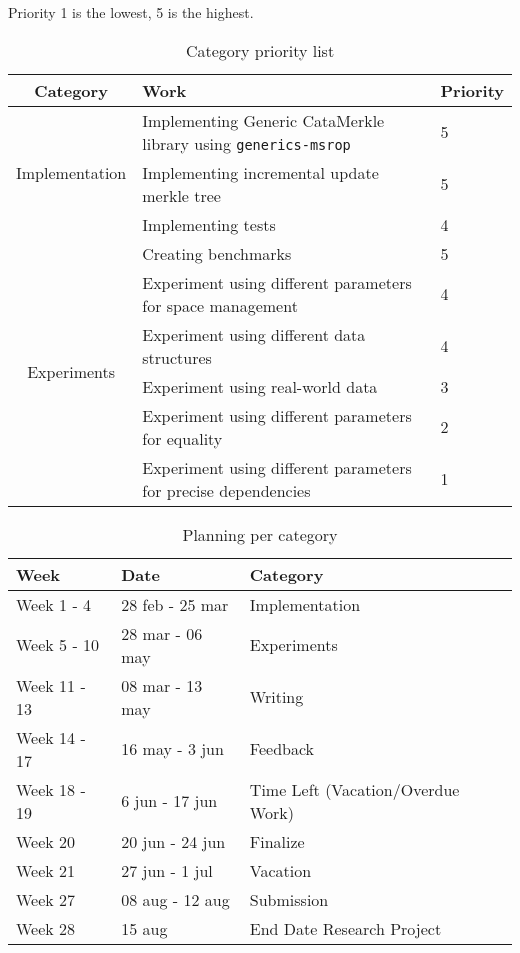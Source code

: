 Priority 1 is the lowest, 5 is the highest.
\begin{table}[H]
    \setlength{\tabcolsep}{8pt}
    \centering
    \small
    \bigskip
    \begin{tabular}{|c|l|l|}
        \hline
        Category & Work & Priority \\
        \hline
        \multirow{3}{7em}{Implementation} & Implementing Generic CataMerkle library using \texttt{generics-msrop} & 5 \\
         & Implementing incremental update merkle tree & 5 \\
         & Implementing tests & 4 \\
        \hline
        \multirow{6}{7em}{Experiments} & Creating benchmarks & 5 \\
         & Experiment using different parameters for space management & 4 \\
         & Experiment using different data structures & 4 \\
         & Experiment using real-world data & 3 \\
         & Experiment using different parameters for equality & 2 \\
         & Experiment using different parameters for precise dependencies & 1 \\
        \hline
    \end{tabular}
\caption{Category priority list}
\label{table:priorities}
\end{table}

\begin{table}[H]
\setlength{\tabcolsep}{8pt}
\centering
\small
\bigskip
\begin{tabular}{|l|l|l|}
    \hline
    Week & Date & Category \\
    \hline
    Week 1 - 4 & 28 feb - 25 mar & Implementation \\
    \hline
    Week 5 - 10 & 28 mar - 06 may & Experiments \\
    \hline
    Week 11 - 13 & 08 mar - 13 may & Writing \\
    \hline
    Week 14 - 17 & 16 may - 3 jun & Feedback \\
    \hline
    Week 18 - 19 & 6 jun - 17 jun & Time Left (Vacation/Overdue Work) \\
    \hline
    Week 20 & 20 jun - 24 jun & Finalize \\
    \hline
    Week 21 & 27 jun - 1 jul & Vacation \\
    \hline
    Week 27 & 08 aug - 12 aug & Submission \\
    \hline 
    Week 28 & 15 aug & End Date Research Project  \\
    \hline
\end{tabular}
\caption{Planning per category}
\label{table:planning}
\end{table}